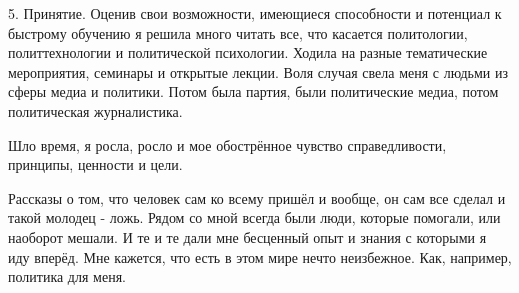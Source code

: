 5. Принятие. Оценив свои возможности, имеющиеся способности и потенциал к
быстрому обучению я решила много читать все, что касается политологии,
политтехнологии и политической психологии. Ходила на разные тематические
мероприятия, семинары и открытые лекции. Воля случая свела меня с людьми из
сферы медиа и политики. Потом была партия, были политические медиа, потом
политическая журналистика. 

Шло время, я росла, росло и мое обострённое чувство справедливости, принципы,
ценности и цели.

Рассказы о том, что человек сам ко всему пришёл и вообще, он сам все сделал и
такой молодец - ложь. Рядом со мной всегда были люди, которые помогали, или
наоборот мешали. И те и те дали мне бесценный опыт и знания с которыми я иду
вперёд. Мне кажется, что есть в этом мире нечто неизбежное. Как, например,
политика для меня.
